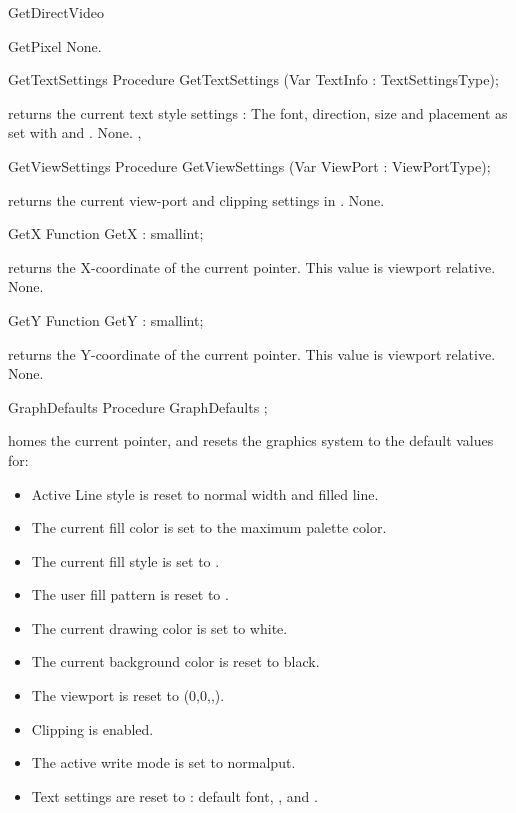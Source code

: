 \begin{function}{GetDirectVideo}
\begin{function}{GetPixel}
\Errors
None.
\SeeAlso

\end{function}
\begin{procedure}{GetTextSettings}
\Declaration
Procedure GetTextSettings (Var TextInfo : TextSettingsType);

\Description
{} returns the current text style settings : The font,
direction, size and placement as set with  and
.
\Errors
None.
\SeeAlso
{}, 

\end{procedure}
\begin{procedure}{GetViewSettings}
\Declaration
Procedure GetViewSettings (Var ViewPort : ViewPortType);

\Description
{} returns the current view-port and clipping settings in
.
\Errors
None.
\SeeAlso
{}
\end{procedure}

\begin{function}{GetX}
\Declaration
Function GetX  : smallint;

\Description
{} returns the X-coordinate of the current pointer. This value is
viewport relative.
\Errors
None.
\SeeAlso
{}
\end{function}
\begin{function}{GetY}
\Declaration
Function GetY  : smallint;

\Description
{} returns the Y-coordinate of the current pointer. This value is
viewport relative.
\Errors
None.
\SeeAlso
{}
\end{function}
\begin{procedure}{GraphDefaults}
\Declaration
Procedure GraphDefaults ;

\Description
{} homes the current pointer, and resets the graphics
system to the default values for:

\begin{itemize}
 \item Active Line style is reset to normal width and filled line.
 \item The current fill color is set to the maximum palette color.
 \item The current fill style is set to .
 \item The user fill pattern is reset to .
 \item The current drawing color is set to white.
 \item The current background color is reset to black.
 \item The viewport is reset to (0,0,,).
 \item Clipping is enabled.
 \item The active write mode is set to normalput.
 \item Text settings are reset to : default font, ,
          and .
\end{itemize}


\end{procedure}
\end{function}
